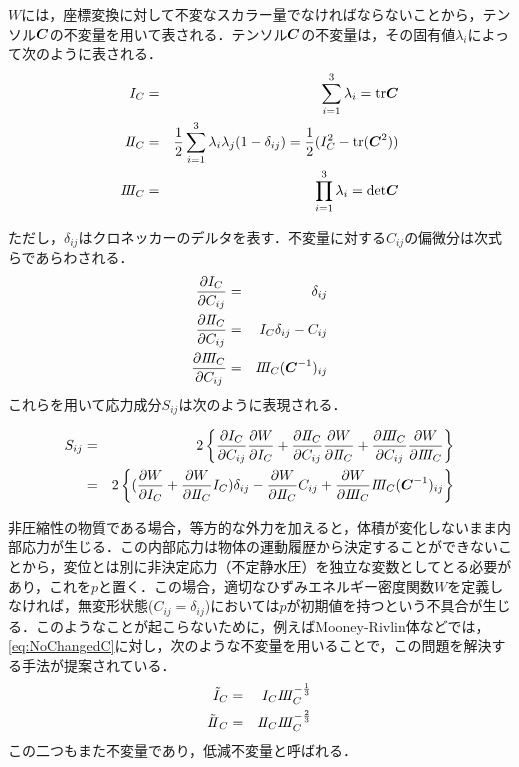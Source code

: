 $ W $には，座標変換に対して不変なスカラー量でなければならないことから，テンソル$ {\mbox{\boldmath $C$}} $の不変量を用いて表される．テンソル$ {\mbox{\boldmath $C$}} $の不変量は，その固有値$\lambda_i $によって次のように表される．
\begin{eqnarray}\label{eq:NoChangedC}
	I_C &=& \sum_{i=1}^{3} \lambda_i = \mathrm{tr}{\mbox{\boldmath $C$}} \\
	I\hspace{-.2em}I_C &=& \frac{1}{2} \sum_{i=1}^{3} \lambda_i \lambda_j (1-\delta_{ij}) = \frac{1}{2} (I_C^2 - \mathrm{tr}({\mbox{\boldmath $C$}}^2)) \\
	I\hspace{-.2em}I\hspace{-.2em}I_C &=& \prod_{i=1}^3 \lambda_i = \mathrm{det} {\mbox{\boldmath $C$}}
\end{eqnarray}

ただし，$ \delta_{ij} $はクロネッカーのデルタを表す．不変量に対する$ C_{ij} $の偏微分は次式らであらわされる．
\begin{eqnarray}\label{eq:PartialChangedC}
	\frac{\partial I_C}{\partial C_{ij}} &=& \delta_{ij} \\
	\frac{\partial I\hspace{-.2em}I_C}{\partial C_{ij}} &=& I_C \delta_{ij}-C_{ij} \\
	\frac{\partial I\hspace{-.2em}I\hspace{-.2em}I_C}{\partial C_{ij}} &=& I\hspace{-.2em}I\hspace{-.2em}I_C({\mbox{\boldmath $C$}}^{-1})_{ij}
\end{eqnarray}
これらを用いて応力成分$ S_{ij} $は次のように表現される．

\begin{eqnarray}\label{eq:StrainVer2}
	S_{ij} &=& 2\left\{	\partdf{I_C}{C_{ij}} \partdf{W}{I_C} + \partdf{\Two_C}{C_{ij}} \partdf{W}{\Two_C} + \partdf{\Three_C}{C_{ij}} \partdf{W}{\Three_C} \right\} \\
	&=& 2\left\{	(\partdf{W}{I_C} +  \partdf{W}{\Two_C} I_C)\delta_{ij} - \partdf{W}{\Two_C}C_{ij} +  \partdf{W}{\Three_C} \Three_C(\bd{C}^{-1})_{ij}\right\}
\end{eqnarray}

非圧縮性の物質である場合，等方的な外力を加えると，体積が変化しないまま内部応力が生じる．この内部応力は物体の運動履歴から決定することができないことから，変位とは別に非決定応力（不定静水圧）を独立な変数としてとる必要があり，これを$ p $と置く．この場合，適切なひずみエネルギー密度関数$ W $を定義しなければ，無変形状態($ C_{ij}  = \delta_{ij}$)においては$ p $が初期値を持つという不具合が生じる．このようなことが起こらないために，例えばMooney-Rivlin体などでは，\eqref{eq:NoChangedC}に対し，次のような不変量を用いることで，この問題を解決する手法が提案されている．
\begin{eqnarray}
	\tilde{I}_C &=& I_C I\hspace{-.2em}I\hspace{-.2em}I_C^{-\frac{1}{3}} \\
	\tilde{I\hspace{-.2em}I}_C &=& I\hspace{-.2em}I_C I\hspace{-.2em}I\hspace{-.2em}I_C^{-\frac{2}{3}}
\end{eqnarray}
この二つもまた不変量であり，低減不変量と呼ばれる．

